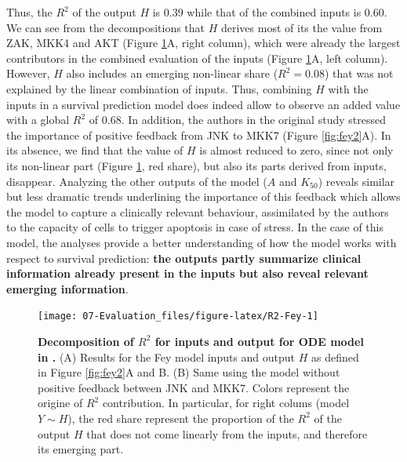 \documentclass[a4paper,12pt,twoside,onecolumn,openright,final,oldfontcommands]{memoir}
\begin{document}
Thus, the \(R^2\) of the output \(H\) is \(0.39\) while that of the
combined inputs is \(0.60\). We can see from the decompositions that
\(H\) derives most of its the value from ZAK, MKK4 and AKT (Figure
\ref{fig:R2-Fey}A, right column), which were already the largest
contributors in the combined evaluation of the inputs (Figure
\ref{fig:R2-Fey}A, left column). However, \(H\) also includes an
emerging non-linear share (\(R^2=0.08\)) that was not explained by the
linear combination of inputs. Thus, combining \(H\) with the inputs in a
survival prediction model does indeed allow to observe an added value
with a global \(R^2\) of \(0.68\). In addition, the authors in the
original study stressed the importance of positive feedback from JNK to
MKK7 (Figure \ref{fig:fey2}A). In its absence, we find that the value of
\(H\) is almost reduced to zero, since not only its non-linear part
(Figure \ref{fig:R2-Fey}, red share), but also its parts derived from
inputs, disappear. Analyzing the other outputs of the model (\(A\) and
\(K_{50}\)) reveals similar but less dramatic trends underlining the
importance of this feedback which allows the model to capture a
clinically relevant behaviour, assimilated by the authors to the
capacity of cells to trigger apoptosis in case of stress. In the case of
this model, the analyses provide a better understanding of how the model
works with respect to survival prediction: \textbf{the outputs partly
summarize clinical information already present in the inputs but also
reveal relevant emerging information}.

\begin{figure}

{\centering \texttt{[image: 07-Evaluation\_files/figure-latex/R2-Fey-1]} 

}

\caption[Decomposition of $R^2$ for inputs and output for ODE model in @fey2015signaling]{\textbf{Decomposition of \(R^2\) for inputs and
output for ODE model in \citet{fey2015signaling}.} (A) Results for the
Fey model inputs and output \(H\) as defined in Figure \ref{fig:fey2}A
and B. (B) Same using the model without positive feedback between JNK
and MKK7. Colors represent the origine of \(R^2\) contribution. In
particular, for right colums (model\(Y\sim H\)), the red share represent
the proportion of the \(R^2\) of the output \(H\) that does not come
linearly from the inputs, and therefore its emerging part.}\label{fig:R2-Fey}
\end{figure}
\end{document}
